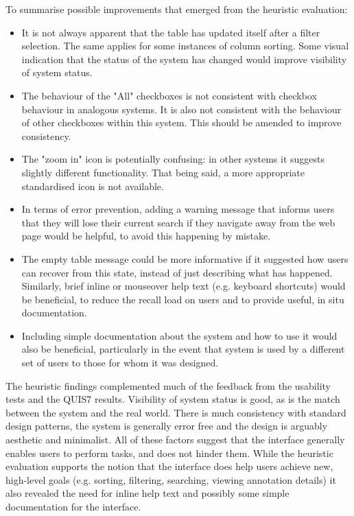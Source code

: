 To summarise possible improvements that emerged from the heuristic evaluation:
\begin{itemize}
 \item It is not always apparent that the table has updated itself after a filter selection. The same applies for some instances of column sorting. Some visual indication that the status of the system has changed would improve visibility of system status. 
 \item The behaviour of the "All" checkboxes is not consistent with checkbox behaviour in analogous systems. It is also not consistent with the behaviour of other checkboxes within this system. This should be amended to improve consistency.  
 \item The "zoom in" icon is potentially confusing: in other systems it suggests slightly different functionality. That being said, a more appropriate standardised icon is not available. 
 \item In terms of error prevention, adding a warning message that informs users that they will lose their current search if they navigate away from the web page would be helpful, to avoid this happening by mistake. 
 \item The empty table message could be more informative if it suggested how users can recover from this state, instead of just describing what has happened. Similarly, brief inline or mouseover help text (e.g. keyboard shortcuts) would be beneficial, to reduce the recall load on users and to provide useful, in situ documentation. 
 \item Including simple documentation about the system and how to use it would also be beneficial, particularly in the event that system is used by a different set of users to those for whom it was designed. 
\end{itemize}

The heuristic findings complemented much of the feedback from the usability tests and the QUIS7 results. Visibility of system status is good, as is the match between the system and the real world. There is much consistency with standard design patterns, the system is generally error free and the design is arguably aesthetic and minimalist. All of these factors suggest that the interface generally enables users to perform tasks, and does not hinder them. While the heuristic evaluation supports the notion that the interface does help users achieve new, high-level goals (e.g. sorting, filtering, searching, viewing annotation details) it also revealed the need for inline help text and possibly some simple documentation for the interface. 


